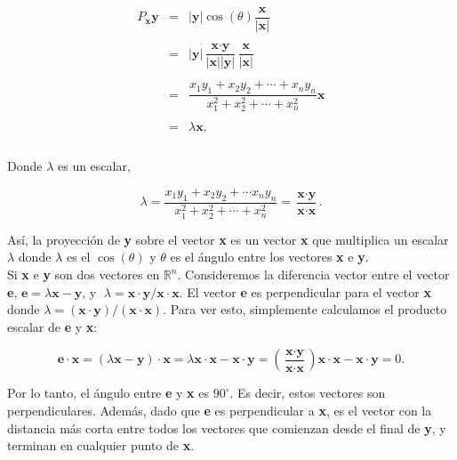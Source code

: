 $$
\begin{array}{rcl}
    P_{\textbf{x}}\textbf{y} &=& |\textbf{y}|\cos(\theta)\dfrac{\textbf{x}}{|\textbf{x}|}\\\\
			     &=& |\textbf{y}|\dfrac{\textbf{x}\cdot \textbf{y}}{|\textbf{x}||\textbf{y}|}\dfrac{\textbf{x}}{|\textbf{x}|} \\\\
			     &=& \dfrac{x_1y_1+x_2y_2+\cdots + x_ny_n}{x_1^2+x_2^2+\cdots + x_n^2}\textbf{x}\\\\
			     &=& \lambda \textbf{x}.\\\\
\end{array}
$$

Donde $\lambda$ es un escalar, 

\begin{tcolorbox}
    \begin{equation}
	\lambda=\dfrac{x_1y_1+x_2y_2+\cdots x_ny_n}{x_1^2+x_2^2 + \cdots + x_n^2}=\dfrac{\textbf{x}\cdot \textbf{y}}{\textbf{x}\cdot \textbf{x}}.
    \end{equation}
\end{tcolorbox}

Así, la proyección de \textbf{y} sobre el vector \textbf{x} es un vector \textbf{x} que multiplica un escalar $\lambda$ donde $\lambda$ es el $\cos(\theta)$ y $\theta$ es el ángulo entre los vectores \textbf{x} e \textbf{y}.\\

Si \textbf{x} e \textbf{y} son dos vectores en $\mathbb{R}^n$. Consideremos la diferencia vector entre el vector \textbf{e}, $\textbf{e}=\lambda \textbf{x}-\textbf{y}$, y $\;\lambda = \textbf{x}\cdot\textbf{y}/\textbf{x}\cdot \textbf{x}.$ El vector \textbf{e} es perpendicular para el vector \textbf{x} donde $\lambda=(\textbf{x}\cdot \textbf{y})/(\textbf{x}\cdot \textbf{x})$. Para ver esto, simplemente calculamos el producto escalar de \textbf{e} y \textbf{x}:

$$\textbf{e}\cdot \textbf{x} = (\lambda \textbf{x}-\textbf{y})\cdot\textbf{x}=\lambda \textbf{x}\cdot \textbf{x}-\textbf{x}\cdot \textbf{y}=\left(\dfrac{\textbf{x}\cdot \textbf{y}}{\textbf{x}\cdot \textbf{x}}\right)\textbf{x}\cdot \textbf{x}-\textbf{x}\cdot\textbf{y}=0.$$

Por lo tanto, el ángulo entre \textbf{e} y \textbf{x} es $90^\circ$. Es decir, estos vectores son perpendiculares. Además, dado que \textbf{e} es perpendicular a \textbf{x}, es el vector con la distancia más corta entre todos los vectores que comienzan desde el final de \textbf{y}, y terminan en cualquier punto de \textbf{x}.\\

